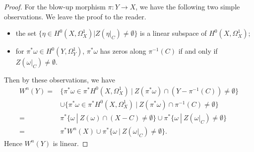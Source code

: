 \documentclass[10pt,a4paper]{amsart}
\begin{document}
\begin{proof}
  For the blow-up morphism $\pi\colon Y\to X$, we have the following two simple observations. We leave the proof to the reader. 
  \begin{itemize}
        \item[(a)] the set $\{\eta\in H^0(X, \Omega_X^1)|Z(\eta|_{C})\neq \emptyset\}$ is a linear subspace of $H^0(X, \Omega_X^1)$;
        \item[(b)] for $\pi^{\ast}\omega\in H^0(Y, \Omega_Y^1)$, $\pi^{\ast}\omega$ has zeros along $\pi^{-1}(C)$ if and only if  $Z(\omega|_C)\neq\emptyset$.
    \end{itemize} 
Then by these observations, we have  
\begin{align*}
W^n(Y) =&\{\pi^{\ast}\omega \in \pi^{\ast} H^0(X, \Omega_X^1)\ |\ Z(\pi^{\ast}\omega)\cap (Y-\pi^{-1}(C))\neq\emptyset\}\\
     &\cup \{\pi^{\ast}\omega \in \pi^{\ast} H^0(X, \Omega_X^1)\ |\ Z(\pi^{\ast}\omega)\cap \pi^{-1}(C)\neq\emptyset\} \\
     =& \pi^{\ast} \{\omega\ |\ Z(\omega)\cap (X-C)\neq\emptyset\}\cup  \pi^{\ast} \{\omega\ |\ Z(\omega|_C)\neq\emptyset\}  \\
     =& \pi^{\ast} W^n(X)\cup \pi^{\ast}\{\omega\ |\ Z(\omega|_C)\neq\emptyset\}.
\end{align*}
Hence $W^n(Y)$ is linear. 
\end{proof}
\end{document}
